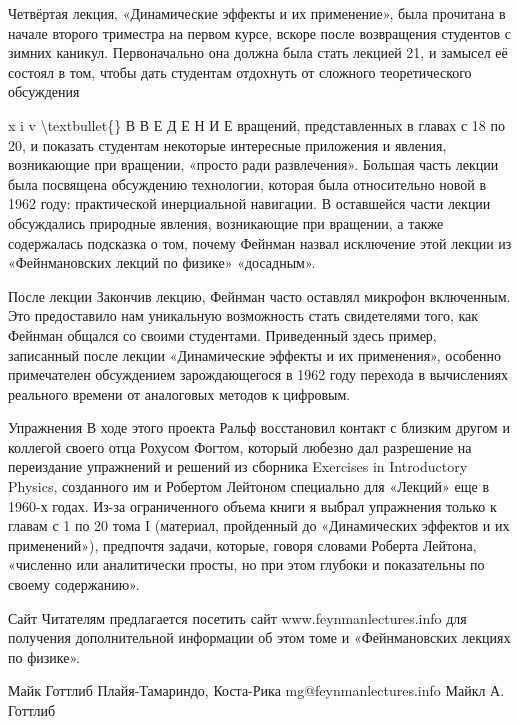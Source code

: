 \documentclass[10pt,oneside]{article}
\begin{document}
Четвёртая лекция, «Динамические эффекты и их применение», была прочитана в начале второго триместра на первом курсе, вскоре после возвращения студентов с зимних каникул. Первоначально она должна была стать лекцией 21, и замысел её состоял в том, чтобы дать студентам отдохнуть от сложного теоретического обсуждения\par

x i v \textbackslash{}textbullet\{\} В В Е Д Е Н И Е вращений, представленных в главах с 18 по 20, и показать студентам некоторые интересные приложения и явления, возникающие при вращении, «просто ради развлечения». Большая часть лекции была посвящена обсуждению технологии, которая была относительно новой в 1962 году: практической инерциальной навигации. В оставшейся части лекции обсуждались природные явления, возникающие при вращении, а также содержалась подсказка о том, почему Фейнман назвал исключение этой лекции из «Фейнмановских лекций по физике» «досадным».\par

После лекции Закончив лекцию, Фейнман часто оставлял микрофон включенным. Это предоставило нам уникальную возможность стать свидетелями того, как Фейнман общался со своими студентами. Приведенный здесь пример, записанный после лекции «Динамические эффекты и их применения», особенно примечателен обсуждением зарождающегося в 1962 году перехода в вычислениях реального времени от аналоговых методов к цифровым.\par

Упражнения В ходе этого проекта Ральф восстановил контакт с близким другом и коллегой своего отца Рохусом Фогтом, который любезно дал разрешение на переиздание упражнений и решений из сборника Exercises in Introductory Physics, созданного им и Робертом Лейтоном специально для «Лекций» еще в 1960-х годах. Из-за ограниченного объема книги я выбрал упражнения только к главам с 1 по 20 тома I (материал, пройденный до «Динамических эффектов и их применений»), предпочтя задачи, которые, говоря словами Роберта Лейтона, «численно или аналитически просты, но при этом глубоки и показательны по своему содержанию».\par

Сайт Читателям предлагается посетить сайт www.feynmanlectures.info для получения дополнительной информации об этом томе и «Фейнмановских лекциях по физике».\par

Майк Готтлиб Плайя-Тамариндо, Коста-Рика mg@feynmanlectures.info Майкл А. Готтлиб\par
\end{document}
